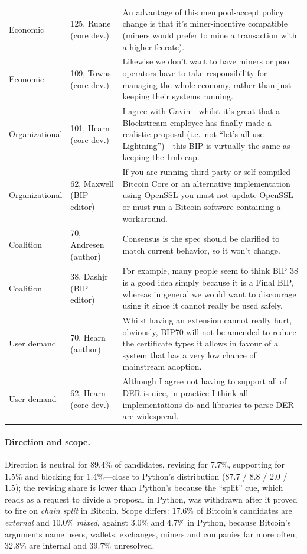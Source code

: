 \begin{table}[t]
\begin{tabular}{p{}p{}p{}}
Economic & 125, Ruane (core dev.) & An advantage of this mempool-accept policy change is that it's miner-incentive compatible (miners would prefer to mine a transaction with a higher feerate). \\
Economic & 109, Towns (core dev.) & Likewise we don't want to have miners or pool operators have to take responsibility for managing the whole economy, rather than just keeping their systems running. \\
Organizational & 101, Hearn (core dev.) & I agree with Gavin---whilst it's great that a Blockstream employee has finally made a realistic proposal (i.e.\ not ``let's all use Lightning'')---this BIP is virtually the same as keeping the 1mb cap. \\
Organizational & 62, Maxwell (BIP editor) & If you are running third-party or self-compiled Bitcoin Core or an alternative implementation using OpenSSL you must not update OpenSSL or must run a Bitcoin software containing a workaround. \\
Coalition & 70, Andresen (author) & Consensus is the spec should be clarified to match current behavior, so it won't change. \\
Coalition & 38, Dashjr (BIP editor) & For example, many people seem to think BIP 38 is a good idea simply because it is a Final BIP, whereas in general we would want to discourage using it since it cannot really be used safely. \\
User demand & 70, Hearn (author) & Whilst having an extension cannot really hurt, obviously, BIP70 will not be amended to reduce the certificate types it allows in favour of a system that has a very low chance of mainstream adoption. \\
User demand & 62, Hearn (core dev.) & Although I agree not having to support all of DER is nice, in practice I think all implementations do and libraries to parse DER are widespread. \\
\bottomrule
\end{tabular}
\end{table}

\paragraph{Direction and scope.} Direction is neutral for 89.4\% of candidates, revising for 7.7\%, supporting for 1.5\% and blocking for 1.4\%---close to Python's distribution (87.7 / 8.8 / 2.0 / 1.5); the revising share is lower than Python's because the ``split'' cue, which reads as a request to divide a proposal in Python, was withdrawn after it proved to fire on \emph{chain split} in Bitcoin. Scope differs: 17.6\% of Bitcoin's candidates are \emph{external} and 10.0\% \emph{mixed}, against 3.0\% and 4.7\% in Python, because Bitcoin's arguments name users, wallets, exchanges, miners and companies far more often; 32.8\% are internal and 39.7\% unresolved.

